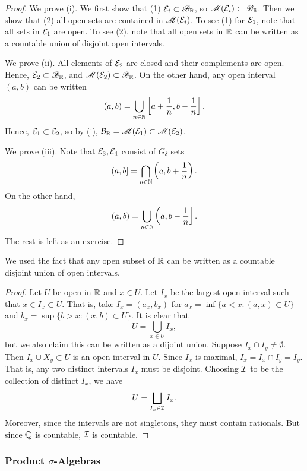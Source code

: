 \documentclass[12pt]{article} %
\begin{document}
\begin{proof}
    We prove (i). We first show that (1) $\mathcal{E}_i \subset \mathscr{B}_{\mathbb{R}}$, so $\mathscr{M}(\mathcal{E}_i) \subset \mathscr{B}_{\mathbb{R}}$. Then we show that (2) all open sets are contained in $\mathscr{M}(\mathcal{E}_i)$. To see (1) for $\mathcal{E}_1$, note that all sets in $\mathcal{E}_1$ are open. To see (2), note that all open sets in $\mathbb{R}$ can be written as a countable union of disjoint open intervals.

    We prove (ii). All elements of $\mathcal{E}_2$ are closed and their complements are open. Hence, $\mathcal{E}_2 \subset \mathscr{B}_{\mathbb{R}}$, and $\mathscr{M}(\mathcal{E}_2) \subset \mathscr{B}_{\mathbb{R}}$. On the other hand, any open interval $(a, b)$ can be written \[(a, b) = \bigcup_{n \in \mathbb{N}} \left[a + \frac{1}{n}, b - \frac{1}{n}\right].\] Hence, $\mathcal{E}_1 \subset \mathcal{E}_2$, so by (i), $\mathcal{B}_{\mathbb{R}} = \mathscr{M}(\mathcal{E}_1) \subset \mathscr{M}(\mathcal{E}_2)$.

    We prove (iii). Note that $\mathcal{E}_3, \mathcal{E}_4$ consist of $G_\delta$ sets \[(a, b] = \bigcap_{n \in \mathbb{N}}\left(a, b + \frac{1}{n}\right).\] On the other hand, \[(a, b) = \bigcup_{n \in \mathbb{N}} \left(a, b - \frac{1}{n}\right].\]
    The rest is left as an exercise.
\end{proof}

\begin{remark}
    We used the fact that any open subset of $\mathbb{R}$ can be written as a countable disjoint union of open intervals.
\end{remark}

\begin{proof}
    Let $U$ be open in $\mathbb{R}$ and $x \in U$. Let $I_x$ be the largest open interval such that $x \in I_x \subset U$. That is, take $I_x = (a_x, b_x)$ for $a_x = \inf\{a < x : (a, x) \subset U\}$ and $b_x = \sup \{ b > x : (x, b) \subset U\}$. It is clear that \[U = \bigcup_{x \in U} I_x,\] but we also claim this can be written as a dijoint union. Suppose $I_x \cap I_y \neq \emptyset$. Then $I_x \cup X_y \subset U$ is an open interval in $U$. Since $I_x$ is maximal, $I_x = I_x \cap I_y = I_y$. That is, any two distinct intervals $I_x$ must be disjoint. Choosing $\mathcal{I}$ to be the collection of distinct $I_x$, we have \[U = \bigsqcup_{I_x \in \mathcal{I}} I_x.\] Moreover, since the intervals are not singletons, they must contain rationals. But since $\mathbb{Q}$ is countable, $\mathcal{I}$ is countable.
\end{proof}

\subsubsection{Product $\sigma$-Algebras}
\end{document}
